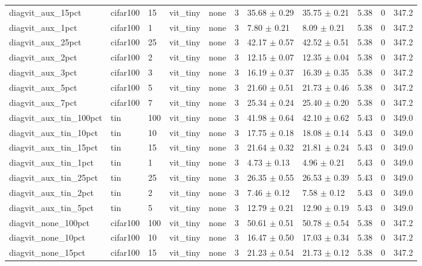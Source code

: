\begin{tabular}{lllllllllll}
diagvit_aux_15pct & cifar100 & 15 & vit_tiny & none & 3 & 35.68 $\pm$ 0.29 & 35.75 $\pm$ 0.21 & 5.38 & 0 & 347.2 \\
diagvit_aux_1pct & cifar100 & 1 & vit_tiny & none & 3 & 7.80 $\pm$ 0.21 & 8.09 $\pm$ 0.21 & 5.38 & 0 & 347.2 \\
diagvit_aux_25pct & cifar100 & 25 & vit_tiny & none & 3 & 42.17 $\pm$ 0.57 & 42.52 $\pm$ 0.51 & 5.38 & 0 & 347.2 \\
diagvit_aux_2pct & cifar100 & 2 & vit_tiny & none & 3 & 12.15 $\pm$ 0.07 & 12.35 $\pm$ 0.04 & 5.38 & 0 & 347.2 \\
diagvit_aux_3pct & cifar100 & 3 & vit_tiny & none & 3 & 16.19 $\pm$ 0.37 & 16.39 $\pm$ 0.35 & 5.38 & 0 & 347.2 \\
diagvit_aux_5pct & cifar100 & 5 & vit_tiny & none & 3 & 21.60 $\pm$ 0.51 & 21.73 $\pm$ 0.46 & 5.38 & 0 & 347.2 \\
diagvit_aux_7pct & cifar100 & 7 & vit_tiny & none & 3 & 25.34 $\pm$ 0.24 & 25.40 $\pm$ 0.20 & 5.38 & 0 & 347.2 \\
diagvit_aux_tin_100pct & tin & 100 & vit_tiny & none & 3 & 41.98 $\pm$ 0.64 & 42.10 $\pm$ 0.62 & 5.43 & 0 & 349.0 \\
diagvit_aux_tin_10pct & tin & 10 & vit_tiny & none & 3 & 17.75 $\pm$ 0.18 & 18.08 $\pm$ 0.14 & 5.43 & 0 & 349.0 \\
diagvit_aux_tin_15pct & tin & 15 & vit_tiny & none & 3 & 21.64 $\pm$ 0.32 & 21.81 $\pm$ 0.24 & 5.43 & 0 & 349.0 \\
diagvit_aux_tin_1pct & tin & 1 & vit_tiny & none & 3 & 4.73 $\pm$ 0.13 & 4.96 $\pm$ 0.21 & 5.43 & 0 & 349.0 \\
diagvit_aux_tin_25pct & tin & 25 & vit_tiny & none & 3 & 26.35 $\pm$ 0.55 & 26.53 $\pm$ 0.39 & 5.43 & 0 & 349.0 \\
diagvit_aux_tin_2pct & tin & 2 & vit_tiny & none & 3 & 7.46 $\pm$ 0.12 & 7.58 $\pm$ 0.12 & 5.43 & 0 & 349.0 \\
diagvit_aux_tin_5pct & tin & 5 & vit_tiny & none & 3 & 12.79 $\pm$ 0.21 & 12.90 $\pm$ 0.19 & 5.43 & 0 & 349.0 \\
diagvit_none_100pct & cifar100 & 100 & vit_tiny & none & 3 & 50.61 $\pm$ 0.51 & 50.78 $\pm$ 0.54 & 5.38 & 0 & 347.2 \\
diagvit_none_10pct & cifar100 & 10 & vit_tiny & none & 3 & 16.47 $\pm$ 0.50 & 17.03 $\pm$ 0.34 & 5.38 & 0 & 347.2 \\
diagvit_none_15pct & cifar100 & 15 & vit_tiny & none & 3 & 21.23 $\pm$ 0.54 & 21.73 $\pm$ 0.12 & 5.38 & 0 & 347.2 \\

\end{tabular}
